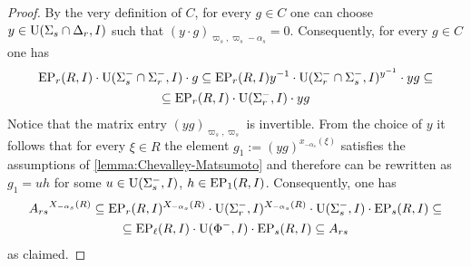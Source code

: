 \begin{proof}
By the very definition of $C$, for every $g \in C$ one can choose $y \in \operatorname{U}(\Sigma_s \cap \Delta_r, I)$ such that $(y \cdot g)_{\varpi_s,\varpi_s - \alpha_s} = 0$.
Consequently, for every $g\in C$ one has
\begin{multline*}
 \operatorname{EP}_r(R, I) \cdot \operatorname{U}(\Sigma_s^- \cap \Sigma_r^-, I) \cdot g \subseteq \operatorname{EP}_r(R, I) y^{-1} \cdot \operatorname{U}(\Sigma_r^-\cap \Sigma_s^-, I)^{y^{-1}} \cdot y g \subseteq \\
  \subseteq \operatorname{EP}_r(R, I) \cdot \operatorname{U}(\Sigma_r^-, I) \cdot y g
\end{multline*}
Notice that the matrix entry $(yg)_{\varpi_s,\varpi_s}$ is invertible.
From the choice of $y$ it follows that for every $\xi\in R$ the element $g_1:=(yg)^{x_{-\alpha_s}(\xi)}$
satisfies the assumptions of \cref{lemma:Chevalley-Matsumoto} and therefore can be rewritten as $g_1 = uh$ for some $u \in \operatorname{U}(\Sigma_s^-, I)$, $h \in \operatorname{EP}_1(R, I)$.
Consequently, one has
\begin{multline*} {A_{rs}}^{X_{-\alpha_{s}}(R)} \subseteq \operatorname{EP}_r(R, I)^{X_{-\alpha_{s}}(R)} \cdot \operatorname{U}(\Sigma_r^-, I)^{X_{-\alpha_{s}}(R)} \cdot \operatorname{U}(\Sigma_s^-, I) \cdot \operatorname{EP}_s(R, I) \subseteq \\
 \subseteq \operatorname{EP}_\ell(R, I) \cdot \operatorname{U}(\Phi^-, I) \cdot \operatorname{EP}_s(R, I) \subseteq A_{rs} \end{multline*}
 as claimed.
\end{proof}